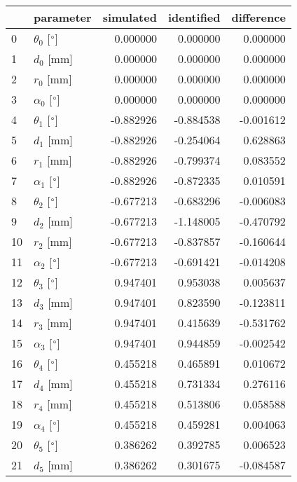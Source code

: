 \documentclass{standalone}%
\begin{document}
%
\normalsize%
\begin{tabular}{llrrr}
\toprule
{} &                 parameter & simulated & identified & difference \\
\midrule
0  &  $\theta_{0}$ [$\degree$] &  0.000000 &   0.000000 &   0.000000 \\
1  &              $d_{0}$ [mm] &  0.000000 &   0.000000 &   0.000000 \\
2  &              $r_{0}$ [mm] &  0.000000 &   0.000000 &   0.000000 \\
3  &  $\alpha_{0}$ [$\degree$] &  0.000000 &   0.000000 &   0.000000 \\
4  &  $\theta_{1}$ [$\degree$] & -0.882926 &  -0.884538 &  -0.001612 \\
5  &              $d_{1}$ [mm] & -0.882926 &  -0.254064 &   0.628863 \\
6  &              $r_{1}$ [mm] & -0.882926 &  -0.799374 &   0.083552 \\
7  &  $\alpha_{1}$ [$\degree$] & -0.882926 &  -0.872335 &   0.010591 \\
8  &  $\theta_{2}$ [$\degree$] & -0.677213 &  -0.683296 &  -0.006083 \\
9  &              $d_{2}$ [mm] & -0.677213 &  -1.148005 &  -0.470792 \\
10 &              $r_{2}$ [mm] & -0.677213 &  -0.837857 &  -0.160644 \\
11 &  $\alpha_{2}$ [$\degree$] & -0.677213 &  -0.691421 &  -0.014208 \\
12 &  $\theta_{3}$ [$\degree$] &  0.947401 &   0.953038 &   0.005637 \\
13 &              $d_{3}$ [mm] &  0.947401 &   0.823590 &  -0.123811 \\
14 &              $r_{3}$ [mm] &  0.947401 &   0.415639 &  -0.531762 \\
15 &  $\alpha_{3}$ [$\degree$] &  0.947401 &   0.944859 &  -0.002542 \\
16 &  $\theta_{4}$ [$\degree$] &  0.455218 &   0.465891 &   0.010672 \\
17 &              $d_{4}$ [mm] &  0.455218 &   0.731334 &   0.276116 \\
18 &              $r_{4}$ [mm] &  0.455218 &   0.513806 &   0.058588 \\
19 &  $\alpha_{4}$ [$\degree$] &  0.455218 &   0.459281 &   0.004063 \\
20 &  $\theta_{5}$ [$\degree$] &  0.386262 &   0.392785 &   0.006523 \\
21 &              $d_{5}$ [mm] &  0.386262 &   0.301675 &  -0.084587 \\

\end{tabular}
\end{document}
